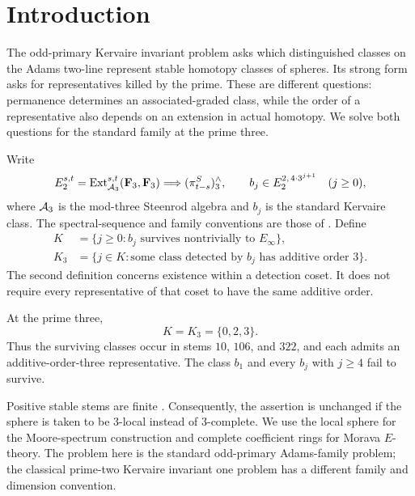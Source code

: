 \begin{abstract}
We solve the Kervaire invariant problem at the prime three for the standard Kervaire classes in the mod-three Adams spectral sequence. These classes survive precisely at indices $0$, $2$, and $3$, and each surviving detection coset contains an element of additive order three. In particular, there is an order-three Kervaire element in stem $322$.
\end{abstract}

\section{Introduction}\label{sec:introduction}

The odd-primary Kervaire invariant problem asks which distinguished classes on the Adams two-line represent stable homotopy classes of spheres. Its strong form asks for representatives killed by the prime. These are different questions: permanence determines an associated-graded class, while the order of a representative also depends on an extension in actual homotopy. We solve both questions for the standard family at the prime three.

Write
\[
 E_2^{s,t}=\operatorname{Ext}_{\mathcal A_3}^{s,t}(\mathbf F_3,\mathbf F_3)
 \Longrightarrow (\pi^S_{t-s})^{\wedge}_3,
 \qquad
 b_j\in E_2^{2,\,4\cdot3^{j+1}}\quad(j\geq0),
\]
where $\mathcal A_3$ is the mod-three Steenrod algebra and $b_j$ is the standard Kervaire class. The spectral-sequence and family conventions are those of \cite[Theorems~2.1.1 and~3.4.4]{Ravenel}. Define
\begin{align*}
 K&=\{j\geq0:b_j\text{ survives nontrivially to }E_\infty\},\\
 K_3&=\{j\in K:\text{some class detected by }b_j
                      \text{ has additive order }3\}.
\end{align*}
The second definition concerns existence within a detection coset. It does not require every representative of that coset to have the same additive order.

\begin{theorem}\label{thm:classification}
At the prime three,
\[
                       K=K_3=\{0,2,3\}.
\]
Thus the surviving classes occur in stems $10$, $106$, and $322$, and each admits an additive-order-three representative. The class $b_1$ and every $b_j$ with $j\geq4$ fail to survive.
\end{theorem}

Positive stable stems are finite \cite[Theorem~1.1.8]{Ravenel}. Consequently, the assertion is unchanged if the sphere is taken to be $3$-local instead of $3$-complete. We use the local sphere for the Moore-spectrum construction and complete coefficient rings for Morava $E$-theory. The problem here is the standard odd-primary Adams-family problem; the classical prime-two Kervaire invariant one problem has a different family and dimension convention.

